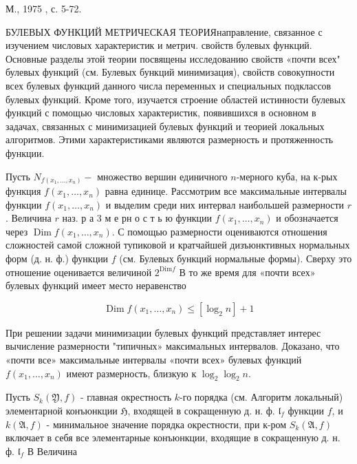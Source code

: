 \documentclass[10pt]{article}
\begin{document}
М., 1975 , с. 5-72.



БУЛЕВЫХ ФУНКЦИЙ МЕТРИЧЕСКАЯ ТЕОРИЯнаправление, связанное с изучением числовых характеристик и метрич. свойств булевых функций. Основные разделы этой теории посвящены исследованию свойств «почти всех" булевых функций (см. Булевых бункций минимизация), свойств совокупности всех булевых функций данного числа переменных и специальных подклассов булевых функций. Кроме того, изучается строение областей истинности булевых функций с помощью числовых характеристик, появившихся в основном в задачах, связанных с минимизацией булевых функций и теорией локальных алгоритмов. Этими характеристиками являются размерность и протяженность функции.



Пусть $N_{f\left(x_{1}, \ldots, x_{n}\right)}-$ множество вершин единичного $n$-мерного куба, на к-рых функция $f\left(x_{1}, \ldots, x_{n}\right)$ равна единице. Рассмотрим все максимальные интервалы функции $f\left(x_{1}, \ldots, x_{n}\right)$ и выделим среди них интервал наибольшей размерности $r$. Величина $r$ наз. р а 3 м е рн о с т ь ю функции $f\left(x_{1}, \ldots, x_{n}\right)$ и обозначается через $\operatorname{Dim} f\left(x_{1}, \ldots, x_{n}\right)$. С помощью размерности оцениваются отношения сложностей самой сложной тупиковой и кратчайшей дизъюнктивных нормальных форм (д. н. ф.) функции $f$ (см. Булевых бункций нормальные формы). Сверху это отношение оценивается величиной $2^{\mathrm{Dim} f}$ В то же время для «почти всех» булевых функций имеет место неравенство



\[

\operatorname{Dim} f\left(x_{1}, \ldots, x_{n}\right) \leqslant\left[\log _{2} n\right]+1

\]



При решении задачи минимизации булевых функций представляет интерес вычисление размерности "типичных» максимальных интервалов. Доказано, что «почти все» максимальные интервалы «почти всех» булевых функций $f\left(x_{1}, \ldots, x_{n}\right)$ имеют размерность, близкую к $\log _{2} \log _{2} n$.



Пусть $S_{k}(\mathfrak{Y}, f)$ - главная окрестность $k$-го порядка (см. Алгоритм локальный) элементарной конъюнкции $\mathfrak{H}$, входящей в сокращенную д. н. ф. $\mathfrak{l}_{f}$ функции $f$, и $k(\mathfrak{A}, f)$ - минимальное значение порядка окрестности, при к-ром $S_{k}(\mathfrak{A}, f)$ включает в себя все элементарные конъюнкции, входящие в сокращенную д. н. ф. $\mathfrak{l}_{f}$ В Величина
\end{document}
